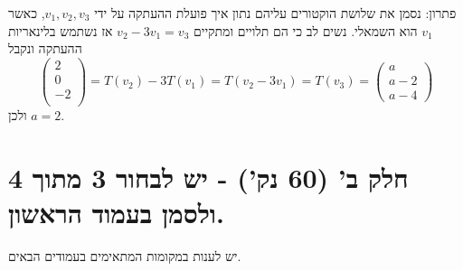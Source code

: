 \documentclass[12pt, a4paper]{article}
\begin{document}
\begin{enumerate}
פתרון:
נסמן את שלושת הוקטורים עליהם נתון איך פועלת ההעתקה על ידי
$v_1,v_2,v_3$,
כאשר
$v_1$
הוא השמאלי.
נשים לב כי הם תלויים ומתקיים
$v_2-3v_1=v_3$
אז
נשתמש בלינאריות ההעתקה ונקבל
$$\begin{pmatrix}
    2\\0\\-2\\
\end{pmatrix}
=T(v_2)-3T(v_1)=T(v_2-3v_1)=T(v_3)
=\begin{pmatrix}a\\a-2\\ a-4 \end{pmatrix}$$
ולכן
$a=2$.
\end{enumerate}

 \pagebreak

\section*{חלק ב' (60 נק') - יש לבחור 3 מתוך 4 ולסמן בעמוד הראשון.}
יש לענות במקומות המתאימים בעמודים הבאים.
\end{document}
